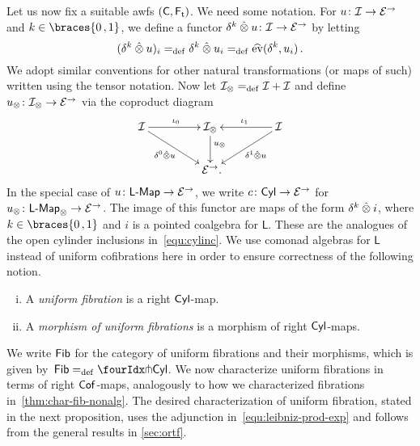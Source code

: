 \documentclass[reqno,10pt,a4paper,oneside,draft]{amsart}
\newcommand{\LL}{\mathsf{L}}
\begin{document}
{{Let us now fix a suitable awfs $(\mathsf{C}, \mathsf{F_t})$.
We need some notation.
For $u \colon \mathcal{I} \to \mathcal{E}^\to$ and $k \in \braces{0\,, 1}$, we define a functor $\delta^k \mathbin{\hat{\otimes}} u \colon \mathcal{I} \to \mathcal{E}^\to$ by letting
\[
(\delta^k \mathbin{\hat{\otimes}} u)_i =_{\operatorname{def}} \delta^k \mathbin{\hat{\otimes}} u_i  =_{\operatorname{def}} \widehat{\operatorname{ev}}(\delta^k, u_i)
\, .\]
We adopt similar conventions for other natural transformations (or maps of such) written using the tensor notation.
Now let $\mathcal{I}_\otimes =_{\operatorname{def}} \mathcal{I} + \mathcal{I}$ and define $u_\otimes \colon \mathcal{I}_\otimes \to \mathcal{E}^\to$ via the coproduct diagram
\begin{equation} \label{equ:u-tensor}
\begin{gathered}
\xymatrix@C+2em{
  \cal{I}
  \ar[r]^{\iota_0}
  \ar[dr]_-{\lcyl \hatotimes u}
&
  \cal{I}_\otimes
  \ar[d]^(.4){u_\otimes}
&
  \cal{I}
  \ar[dl]^-{\rcyl \hatotimes u}
  \ar[l]_{\iota_1}
\\&
  \catE^\to
\rlap{.}}
\end{gathered}
\end{equation}
In the special case of $u \co \pCoalg{\LL} \to \cal{E}^\to$, we write $c \colon \mathsf{Cyl} \to \mathcal{E}^\to$ for $u_\otimes \co \pCoalg{\LL}_\otimes \to \cal{E}^\to$.
The image of this functor are maps of the form $\delta^k \mathbin{\hat{\otimes}} i$, where $k \in \braces{0\,, 1}$ and $i$ is a pointed coalgebra for $\LL$.
These are the analogues of the open cylinder inclusions in~\eqref{equ:cylinc}.
We use comonad algebras for $\LL$ instead of uniform cofibrations here in order to ensure correctness of the following notion.

\begin{definition} \label{def:I-fibration} \leavevmode
\begin{enumerate}[(i)]
\item A \emph{uniform fibration} is a right $\mathsf{Cyl}$-map.
\item A \emph{morphism of uniform fibrations} is a morphism of right $\mathsf{Cyl}$-maps.
\end{enumerate}
\end{definition}

We write $\mathsf{Fib}$ for the category of uniform fibrations and their morphisms, which is given by~$\Fib  \defeq \liftr{\Cyl}$.
We now characterize uniform fibrations in terms of right $\mathsf{Cof}$-maps, analogously to how we characterized fibrations
in~\cref{thm:char-fib-nonalg}. The desired characterization of uniform fibration, stated in the next proposition, uses
the adjunction in~\eqref{equ:leibniz-prod-exp} and follows from the general results in \cref{sec:ortf}.



}}
\end{document}
